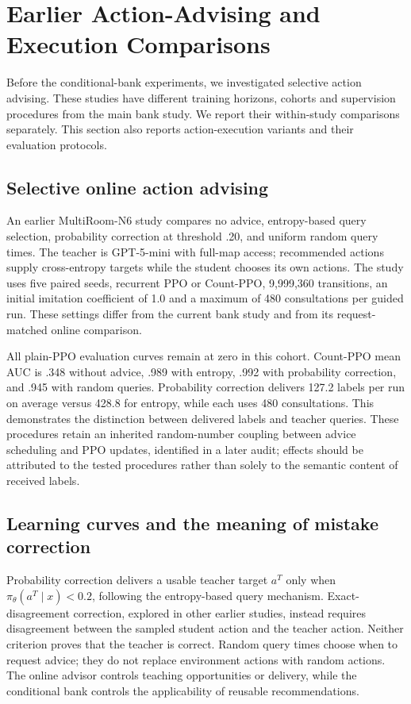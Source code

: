 \section{Earlier Action-Advising and Execution Comparisons}
\label{sec:supp:earlier}

Before the conditional-bank experiments, we investigated selective
action advising. These studies have different training horizons,
cohorts and supervision procedures from the main bank study. We
report their within-study comparisons separately. This section also
reports action-execution variants and their evaluation protocols.

\subsection{Selective online action advising}
An earlier MultiRoom-N6 study compares no advice, entropy-based query
selection, probability correction at threshold .20, and uniform random
query times. The teacher is GPT-5-mini with full-map access; recommended
actions supply cross-entropy targets while the student chooses its own
actions. The study uses five paired seeds, recurrent PPO or Count-PPO,
9,999,360 transitions, an initial imitation coefficient of 1.0 and a maximum
of 480 consultations per guided run. These settings differ from the
current bank study and from its request-matched online comparison.



All plain-PPO evaluation curves remain at zero in this cohort. Count-PPO
mean AUC is .348 without advice, .989 with entropy, .992 with probability
correction, and .945 with random queries. Probability correction delivers
127.2 labels per run on average versus 428.8 for entropy, while each uses
480 consultations. This demonstrates the distinction between delivered
labels and teacher queries. These procedures retain an inherited
random-number coupling between advice scheduling and PPO updates, identified
in a later audit; effects should be attributed to the tested procedures
rather than solely to the semantic content of received labels.

\subsection{Learning curves and the meaning of mistake correction}
Probability correction delivers a usable teacher target $a^T$ only when
$\pi_\theta(a^T\mid x)<0.2$, following the entropy-based query mechanism.
Exact-disagreement correction, explored in other earlier studies, instead
requires disagreement between the sampled student action and the teacher
action. Neither criterion proves that the teacher is correct. Random
query times choose when to request advice; they do not replace environment
actions with random actions. The online advisor controls teaching
opportunities or delivery, while the conditional bank controls the
applicability of reusable recommendations.

